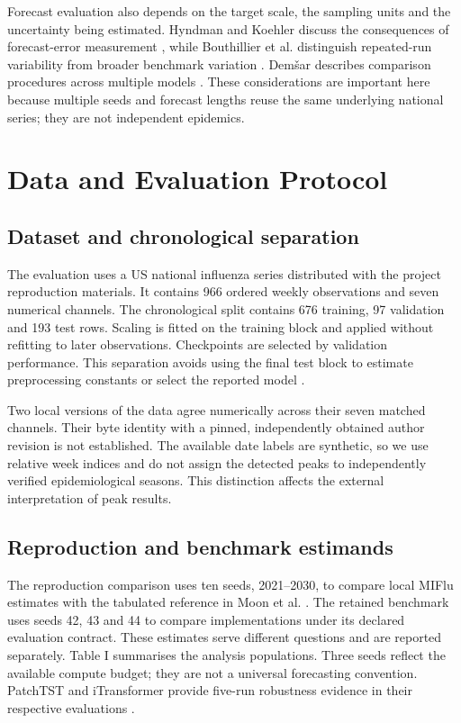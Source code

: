 \documentclass[journal,twoside,print]{ieeecolor}
\begin{document}
Forecast evaluation also depends on the target scale, the sampling units and the uncertainty being estimated. Hyndman and Koehler discuss the consequences of forecast-error measurement \cite{r21}, while Bouthillier et al. distinguish repeated-run variability from broader benchmark variation \cite{r19}. Demšar describes comparison procedures across multiple models \cite{r20}. These considerations are important here because multiple seeds and forecast lengths reuse the same underlying national series; they are not independent epidemics.

\section{Data and Evaluation Protocol}
\subsection{Dataset and chronological separation}
The evaluation uses a US national influenza series distributed with the project reproduction materials. It contains 966 ordered weekly observations and seven numerical channels. The chronological split contains 676 training, 97 validation and 193 test rows. Scaling is fitted on the training block and applied without refitting to later observations. Checkpoints are selected by validation performance. This separation avoids using the final test block to estimate preprocessing constants or select the reported model \cite{r22}.

Two local versions of the data agree numerically across their seven matched channels. Their byte identity with a pinned, independently obtained author revision is not established. The available date labels are synthetic, so we use relative week indices and do not assign the detected peaks to independently verified epidemiological seasons. This distinction affects the external interpretation of peak results.

\subsection{Reproduction and benchmark estimands}
The reproduction comparison uses ten seeds, 2021--2030, to compare local MIFlu estimates with the tabulated reference in Moon et al. \cite{r1}. The retained benchmark uses seeds 42, 43 and 44 to compare implementations under its declared evaluation contract. These estimates serve different questions and are reported separately. Table I summarises the analysis populations. Three seeds reflect the available compute budget; they are not a universal forecasting convention. PatchTST and iTransformer provide five-run robustness evidence in their respective evaluations \cite{r3,r5}.
\end{document}
